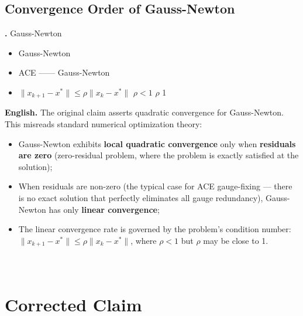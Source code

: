 \documentclass[11pt,a4paper]{article}
\theoremstyle{plain}
\theoremstyle{definition}
\theoremstyle{remark}
\begin{document}
\subsection*{Convergence Order of Gauss-Newton}

\noindent
\textbf{.}
 Gauss-Newton 

\begin{itemize}
  \item Gauss-Newton \textbf{}\textbf{}
        
  \item  ACE ——
        Gauss-Newton \textbf{}
  \item $\|x_{k+1} - x^*\| \leq \rho \|x_k - x^*\|$
         $\rho < 1$  $\rho$  1
\end{itemize}

\medskip
\noindent
\textbf{English.}
The original claim asserts quadratic convergence for Gauss-Newton. This
misreads standard numerical optimization theory:

\begin{itemize}
  \item Gauss-Newton exhibits \textbf{local quadratic convergence} only when
        \textbf{residuals are zero} (zero-residual problem, where the problem
        is exactly satisfied at the solution);
  \item When residuals are non-zero (the typical case for ACE gauge-fixing —
        there is no exact solution that perfectly eliminates all gauge
        redundancy), Gauss-Newton has only \textbf{linear convergence};
  \item The linear convergence rate is governed by the problem's condition
        number: $\|x_{k+1} - x^*\| \leq \rho \|x_k - x^*\|$, where $\rho < 1$
        but $\rho$ may be close to 1.
\end{itemize}

\section{ \\ Corrected Claim}
\end{document}
